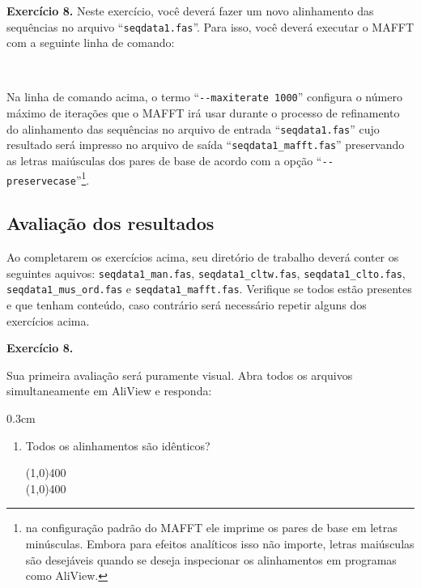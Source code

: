 \begin{refsection}
\begin{blackBlock}{\textbf{Exercício 8.}}
Neste exercício, você deverá fazer um novo alinhamento das sequências no arquivo ``\texttt{seqdata1.fas}''. Para isso, você deverá executar o MAFFT com a seguinte linha de comando:

\scriptsize
{}\\
\normalsize

\end{blackBlock}

Na linha de comando acima, o termo ``\texttt{-{}-maxiterate 1000}'' configura o número máximo de iterações que o MAFFT irá usar durante o processo de refinamento do alinhamento das sequências no arquivo de entrada ``\texttt{seqdata1.fas}'' cujo resultado será impresso no arquivo de saída ``\texttt{seqdata1\_mafft.fas}'' preservando as letras maiúsculas dos pares de base de acordo com a opção ``\texttt{-{}-preservecase}''\footnote{ na configuração padrão do MAFFT ele imprime os pares de base em letras minúsculas. Embora para efeitos analíticos isso não importe, letras maiúsculas são desejáveis quando se deseja inspecionar os alinhamentos em programas como AliView.}.


\subsection{Avaliação dos resultados}\label{tut8:msa:results}

Ao completarem os exercícios acima, seu diretório de trabalho deverá conter os seguintes aquivos: \texttt{seqdata1\_man.fas}, \texttt{seqdata1\_cltw.fas}, \texttt{seqdata1\_clto.fas}, \texttt{seqdata1\_mus\_ord.fas} e \texttt{seqdata1\_mafft.fas}. Verifique se todos estão presentes e que tenham conteúdo, caso contrário será necessário repetir alguns dos exercícios acima.


\begin{blackBlock}{\textbf{Exercício 8.}}\label{tut8:ex:8.6}

Sua primeira avaliação será puramente visual. Abra todos os arquivos simultaneamente em AliView e responda:

\end{blackBlock}


\begin {myindentpar}{0.3cm}
\begin{enumerate}[\itshape i.]
	\item{Todos os alinhamentos são idênticos?}

\line(1,0){400}\\
\line(1,0){400}\\


\end{enumerate}
\end{myindentpar}
\end{refsection}
